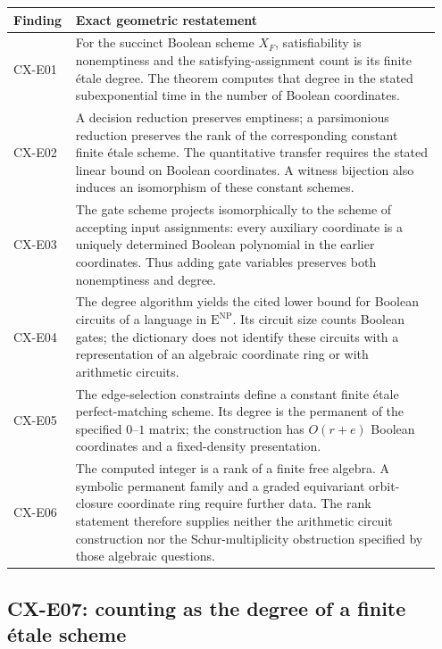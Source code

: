\documentclass[11pt,a4paper]{article}
\begin{document}
\begin{longtable}{@{}p{0.12\linewidth}p{0.83\linewidth}@{}}
\hline
Finding & Exact geometric restatement\\
\hline
CX-E01 &
For the succinct Boolean scheme \(X_F\), satisfiability is
nonemptiness and the satisfying-assignment count is its finite
étale degree. The theorem computes that degree in the stated
subexponential time in the number of Boolean coordinates.\\[4pt]
CX-E02 &
A decision reduction preserves emptiness; a parsimonious reduction
preserves the rank of the corresponding constant finite étale
scheme. The quantitative transfer requires the stated linear bound
on Boolean coordinates. A witness bijection also induces an
isomorphism of these constant schemes.\\[4pt]
CX-E03 &
The gate scheme projects isomorphically to the scheme of accepting
input assignments: every auxiliary coordinate is a uniquely
determined Boolean polynomial in the earlier coordinates.
Thus adding gate variables preserves both nonemptiness and degree.\\[4pt]
CX-E04 &
The degree algorithm yields the cited lower bound for Boolean
circuits of a language in \(\mathrm E^{\mathrm{NP}}\).
Its circuit size counts Boolean gates; the dictionary does not
identify these circuits with a representation of an algebraic
coordinate ring or with arithmetic circuits.\\[4pt]
CX-E05 &
The edge-selection constraints define a constant finite étale
perfect-matching scheme. Its degree is the permanent of the
specified \(0\)--\(1\) matrix; the construction has \(O(r+e)\)
Boolean coordinates and a fixed-density presentation.\\[4pt]
CX-E06 &
The computed integer is a rank of a finite free algebra.
A symbolic permanent family and a graded equivariant
orbit-closure coordinate ring require further data.
The rank statement therefore supplies neither the arithmetic
circuit construction nor the Schur-multiplicity obstruction
specified by those algebraic questions.\\
\hline
\end{longtable}

\subsection{CX-E07: counting as the degree of a finite étale scheme}
\label{finding:CX-E07}
\end{document}
